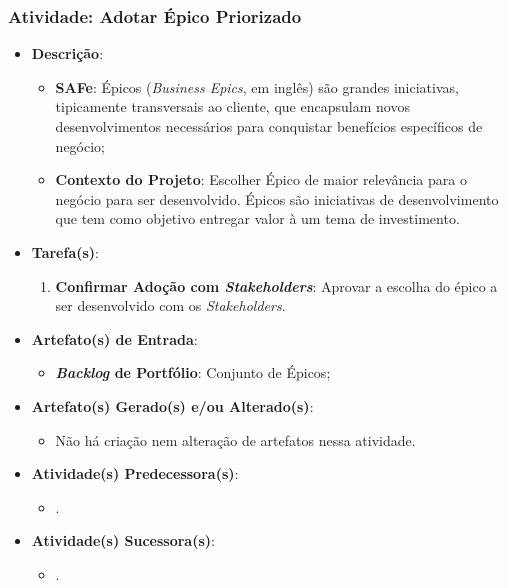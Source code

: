 			\subsubsection[Atividade: Adotar Épico Priorizado]{Atividade: Adotar Épico Priorizado}
			\label{subsubsec:processo_atividade_portfolio_adotar_epico}
				\begin{itemize}
					\item{\textbf{Descrição}:
						\begin{itemize}
							\item{\textbf{SAFe}: Épicos (\emph{Business Epics}, em inglês) são grandes iniciativas, tipicamente transversais ao cliente, que encapsulam novos desenvolvimentos necessários para conquistar benefícios específicos de negócio;}
							\item{\textbf{Contexto do Projeto}: Escolher Épico de maior relevância para o negócio para ser desenvolvido. Épicos são iniciativas de desenvolvimento que tem como objetivo entregar valor à um tema de investimento.}
						\end{itemize}}
					\item{\textbf{Tarefa(s)}:
						\begin{enumerate}
							\item{\textbf{Confirmar Adoção com \emph{Stakeholders}}: Aprovar a escolha do épico a ser desenvolvido com os \emph{Stakeholders}.}
						\end{enumerate}}
					\item{\textbf{Artefato(s) de Entrada}:
						\begin{itemize}
							\item{\textbf{\emph{Backlog} de Portfólio}: Conjunto de Épicos;}
						\end{itemize}}
					\item{\textbf{Artefato(s) Gerado(s) e/ou Alterado(s)}:
						\begin{itemize}
							\item{Não há criação nem alteração de artefatos nessa atividade.}
						\end{itemize}}
					\item{\textbf{Atividade(s) Predecessora(s)}:
						\begin{itemize}
							\item{.}
						\end{itemize}}
					\item{\textbf{Atividade(s) Sucessora(s)}:
						\begin{itemize}
							\item{.}
						\end{itemize}}
				\end{itemize}

